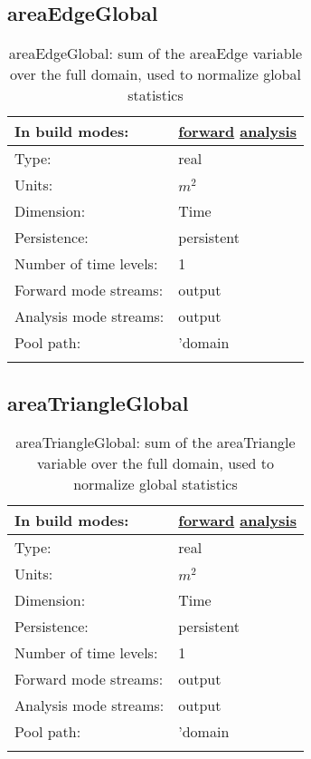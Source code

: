 \subsection[areaEdgeGlobal]{areaEdgeGlobal}
\label{subsec:var_sec_diagnostics_areaEdgeGlobal}
\begin{center}
\begin{longtable}{| p{2.0in} | p{4.0in} |}
        \hline 
        In build modes: & \hyperref[subsec:forward_var_tab_diagnostics]{forward} \hyperref[subsec:analysis_var_tab_diagnostics]{analysis} \\
        \hline 
        Type: & real \\
        \hline 
        Units: & $m^2$ \\
        \hline 
        Dimension: & Time \\
        \hline 
        Persistence: & persistent \\
        \hline 
        Number of time levels: & 1 \\
        \hline 
		 Forward mode streams: &  output \\
        \hline 
		 Analysis mode streams: &  output \\
        \hline 
            Pool path: & 'domain %
 \\
		 \hline 
    \caption{areaEdgeGlobal: sum of the areaEdge variable over the full domain, used to normalize global statistics}
\end{longtable}
\end{center}
\subsection[areaTriangleGlobal]{areaTriangleGlobal}
\label{subsec:var_sec_diagnostics_areaTriangleGlobal}
\begin{center}
\begin{longtable}{| p{2.0in} | p{4.0in} |}
        \hline 
        In build modes: & \hyperref[subsec:forward_var_tab_diagnostics]{forward} \hyperref[subsec:analysis_var_tab_diagnostics]{analysis} \\
        \hline 
        Type: & real \\
        \hline 
        Units: & $m^2$ \\
        \hline 
        Dimension: & Time \\
        \hline 
        Persistence: & persistent \\
        \hline 
        Number of time levels: & 1 \\
        \hline 
		 Forward mode streams: &  output \\
        \hline 
		 Analysis mode streams: &  output \\
        \hline 
            Pool path: & 'domain %
 \\
		 \hline 
    \caption{areaTriangleGlobal: sum of the areaTriangle variable over the full domain, used to normalize global statistics}
\end{longtable}
\end{center}
